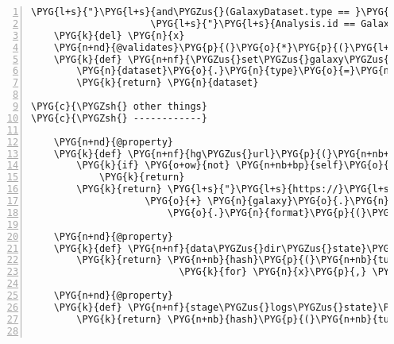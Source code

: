 \begin{Verbatim}[commandchars=\\\{\},numbers=left,firstnumber=1,stepnumber=5]
                \PYG{l+s}{"}\PYG{l+s}{and\PYGZus{}(GalaxyDataset.type == }\PYG{l+s}{'}\PYG{l+s+si}{\PYGZpc{}s}\PYG{l+s}{'}\PYG{l+s}{, }\PYG{l+s}{"}
                     \PYG{l+s}{"}\PYG{l+s}{Analysis.id == GalaxyDataset.analysis\PYGZus{}id)}\PYG{l+s}{"} \PYG{o}{\PYGZpc{}} \PYG{n}{x}\PYG{p}{)}
    \PYG{k}{del} \PYG{n}{x}
    \PYG{n+nd}{@validates}\PYG{p}{(}\PYG{o}{*}\PYG{p}{(}\PYG{l+s}{"}\PYG{l+s}{galaxy\PYGZus{}}\PYG{l+s}{"} \PYG{o}{+} \PYG{n}{x} \PYG{k}{for} \PYG{n}{x} \PYG{o+ow}{in} \PYG{n}{galaxy\PYGZus{}stuff}\PYG{p}{)}\PYG{p}{)}
    \PYG{k}{def} \PYG{n+nf}{\PYGZus{}set\PYGZus{}galaxy\PYGZus{}}\PYG{p}{(}\PYG{n+nb+bp}{self}\PYG{p}{,} \PYG{n}{attr}\PYG{p}{,} \PYG{n}{dataset}\PYG{p}{)}\PYG{p}{:}
        \PYG{n}{dataset}\PYG{o}{.}\PYG{n}{type}\PYG{o}{=}\PYG{n}{attr}\PYG{p}{[}\PYG{l+m+mi}{7}\PYG{p}{:}\PYG{p}{]}
        \PYG{k}{return} \PYG{n}{dataset}

\PYG{c}{\PYGZsh{} other things}
\PYG{c}{\PYGZsh{} ------------}

    \PYG{n+nd}{@property}
    \PYG{k}{def} \PYG{n+nf}{hg\PYGZus{}url}\PYG{p}{(}\PYG{n+nb+bp}{self}\PYG{p}{)}\PYG{p}{:}
        \PYG{k}{if} \PYG{o+ow}{not} \PYG{n+nb+bp}{self}\PYG{o}{.}\PYG{n}{galaxy\PYGZus{}hg\PYGZus{}text}\PYG{p}{:}
            \PYG{k}{return}
        \PYG{k}{return} \PYG{l+s}{"}\PYG{l+s}{https://}\PYG{l+s}{"} \PYG{o}{+} \PYG{n}{galaxy}\PYG{o}{.}\PYG{n}{hostname} \PYGZbs{}
                    \PYG{o}{+} \PYG{n}{galaxy}\PYG{o}{.}\PYG{n}{dataset\PYGZus{}display\PYGZus{}url\PYGZus{}template} \PYGZbs{}
                        \PYG{o}{.}\PYG{n}{format}\PYG{p}{(}\PYG{n}{dataset}\PYG{o}{=}\PYG{n+nb+bp}{self}\PYG{o}{.}\PYG{n}{galaxy\PYGZus{}hg\PYGZus{}text}\PYG{o}{.}\PYG{n}{id}\PYG{p}{)}

    \PYG{n+nd}{@property}
    \PYG{k}{def} \PYG{n+nf}{data\PYGZus{}dir\PYGZus{}state}\PYG{p}{(}\PYG{n+nb+bp}{self}\PYG{p}{)}\PYG{p}{:}
        \PYG{k}{return} \PYG{n+nb}{hash}\PYG{p}{(}\PYG{n+nb}{tuple}\PYG{p}{(}\PYG{p}{(}\PYG{n}{x}\PYG{p}{,}\PYG{n+nb}{tuple}\PYG{p}{(}\PYG{n}{y}\PYG{p}{)}\PYG{p}{,}\PYG{n+nb}{tuple}\PYG{p}{(}\PYG{n}{z}\PYG{p}{)}\PYG{p}{)}
                          \PYG{k}{for} \PYG{n}{x}\PYG{p}{,} \PYG{n}{y}\PYG{p}{,} \PYG{n}{z} \PYG{o+ow}{in} \PYG{n}{os}\PYG{o}{.}\PYG{n}{walk}\PYG{p}{(}\PYG{n+nb+bp}{self}\PYG{o}{.}\PYG{n}{data\PYGZus{}dir}\PYG{p}{)}\PYG{p}{)}\PYG{p}{)}

    \PYG{n+nd}{@property}
    \PYG{k}{def} \PYG{n+nf}{stage\PYGZus{}logs\PYGZus{}state}\PYG{p}{(}\PYG{n+nb+bp}{self}\PYG{p}{)}\PYG{p}{:}
        \PYG{k}{return} \PYG{n+nb}{hash}\PYG{p}{(}\PYG{n+nb}{tuple}\PYG{p}{(}\PYG{n+nb+bp}{self}\PYG{o}{.}\PYG{n}{stage\PYGZus{}logs}\PYG{p}{)}\PYG{p}{)}


\end{Verbatim}
